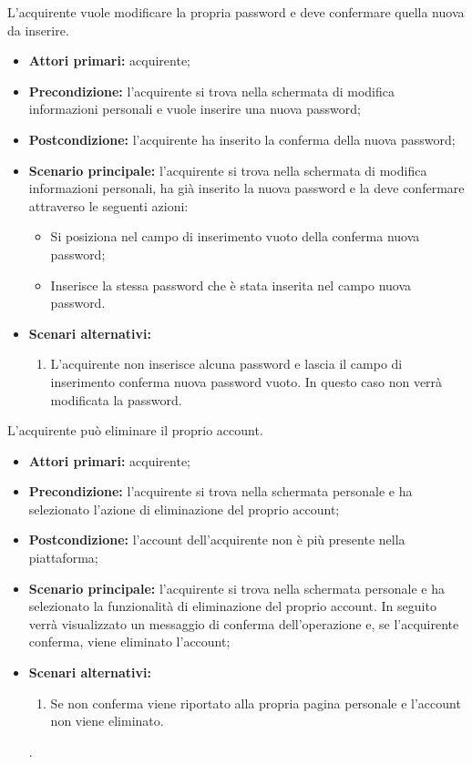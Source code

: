 L'acquirente vuole modificare la propria password e deve confermare quella nuova da inserire.
\begin{itemize}
    \item \textbf{Attori primari:} acquirente;
    \item \textbf{Precondizione:} l'acquirente si trova nella schermata di modifica informazioni personali e vuole inserire una nuova password;
    \item \textbf{Postcondizione:} l'acquirente ha inserito la conferma della nuova password;
    \item \textbf{Scenario principale:} l'acquirente si trova nella schermata di modifica informazioni personali, ha già inserito la nuova password e la deve confermare attraverso le seguenti azioni:
    \begin{itemize}
           \item Si posiziona nel campo di inserimento vuoto della conferma nuova password;
            \item Inserisce la stessa password che è stata inserita nel campo nuova password.
      \end{itemize}
    \item \textbf{Scenari alternativi:} 
    \begin{enumerate}[label=\lett] 
        \item L'acquirente non inserisce alcuna password e lascia il campo di inserimento conferma nuova password vuoto. In questo caso non verrà modificata la password.
    \end{enumerate}
\end{itemize}


L'acquirente può eliminare il proprio account.
\begin{itemize}
    \item \textbf{Attori primari:} acquirente;
    \item \textbf{Precondizione:} l'acquirente si trova nella schermata personale e ha selezionato l'azione di eliminazione del proprio account;
    \item \textbf{Postcondizione:} l'account dell'acquirente non è più presente nella piattaforma;
    \item \textbf{Scenario principale:} l'acquirente si trova nella schermata personale e ha selezionato la funzionalità di eliminazione del proprio account. In seguito verrà visualizzato un messaggio di conferma dell'operazione e, se l'acquirente conferma, viene eliminato l'account;
    \item \textbf{Scenari alternativi:}
    \begin{enumerate}[label=\lett]
        \item Se non conferma viene riportato alla propria pagina personale e l'account non viene eliminato.
    \end{enumerate}.
\end{itemize}
